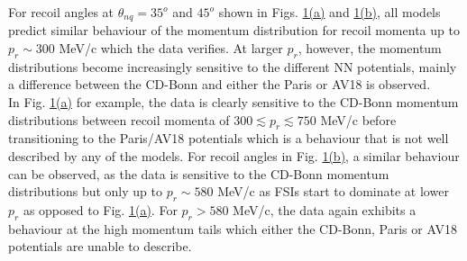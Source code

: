 \indent For recoil angles at $\theta_{nq}=35^{o}$ and $45^{o}$ shown in Figs. \hyperref[fig:fig1]{1(a)} and \hyperref[fig:fig1]{1(b)},  all models predict similar behaviour of the
momentum distribution for recoil momenta up to $p_{r}\sim$300 MeV/c which the data verifies. At larger $p_{r}$, however, the momentum distributions become increasingly sensitive to the different
NN potentials, mainly a difference between the CD-Bonn and either the Paris or AV18 is observed. \\
\indent In Fig. \hyperref[fig:fig1]{1(a)} for example, the data is clearly sensitive to the CD-Bonn momentum distributions between recoil momenta of $300\lesssim p_{r}\lesssim750$ MeV/c before transitioning
to the Paris/AV18 potentials which is a behaviour that is not well described by any of the models. For recoil angles in Fig. \hyperref[fig:fig1]{1(b)},
a similar behaviour can be observed, as the data is sensitive to the CD-Bonn momentum distributions but only up to $p_{r}\sim 580$ MeV/c as FSIs start to dominate at lower $p_{r}$ as opposed to Fig. \hyperref[fig:fig1]{1(a)}.
For $p_{r}>580$ MeV/c, the data again exhibits a behaviour at the high momentum tails which either the CD-Bonn, Paris or AV18 potentials are unable to describe.\\




